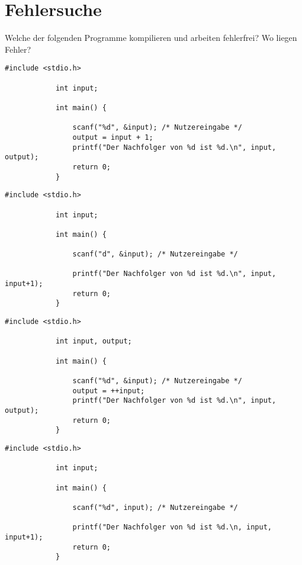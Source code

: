 \documentclass[]{article}
\begin{document}
	\section{Fehlersuche}
	
	Welche der folgenden Programme kompilieren und arbeiten fehlerfrei? Wo liegen Fehler?
	\vspace{3ex}
	
	\noindent
	\begin{minipage}{0.5\linewidth} %
		\begin{lstlisting}[gobble=6]
			#include <stdio.h>
			
			int input;
			
			int main() {
			
				scanf("%d", &input); /* Nutzereingabe */
				output = input + 1;
				printf("Der Nachfolger von %d ist %d.\n", input, output);
				return 0;
			}
		\end{lstlisting}
	\end{minipage}
	\quad
	\begin{minipage}{0.5\linewidth} %
		\begin{lstlisting}[gobble=6]
			#include <stdio.h>
			
			int input;
			
			int main() {
			
				scanf("d", &input); /* Nutzereingabe */
				
				printf("Der Nachfolger von %d ist %d.\n", input, input+1);
				return 0;
			}
		\end{lstlisting}
	\end{minipage}
	\begin{minipage}{0.5\linewidth} %
		\begin{lstlisting}[gobble=6]
			#include <stdio.h>
			
			int input, output;
			
			int main() {
			
				scanf("%d", &input); /* Nutzereingabe */
				output = ++input;
				printf("Der Nachfolger von %d ist %d.\n", input, output);
				return 0;
			}
		\end{lstlisting}
	\end{minipage}
	\quad
	\begin{minipage}{0.5\linewidth} %
		\begin{lstlisting}[gobble=6]
			#include <stdio.h>
			
			int input;
			
			int main() {
			
				scanf("%d", input); /* Nutzereingabe */
				
				printf("Der Nachfolger von %d ist %d.\n, input, input+1);
				return 0;
			}
		\end{lstlisting}
	\end{minipage}
\end{document}

